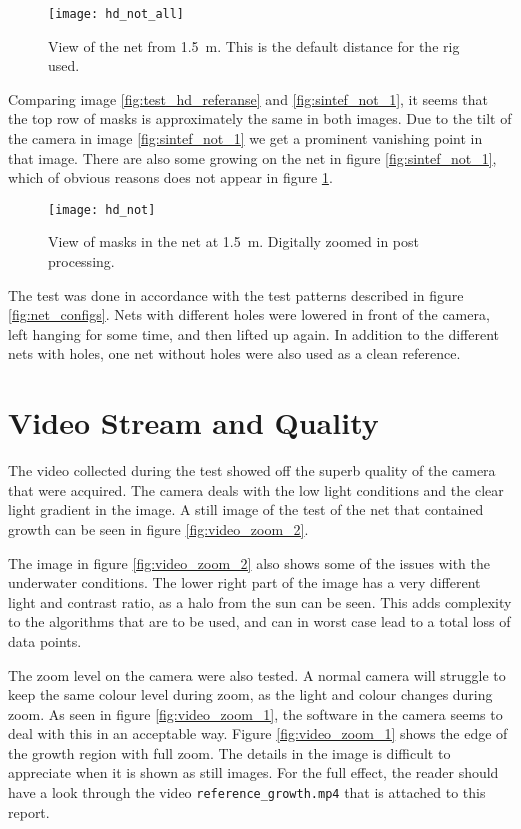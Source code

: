 \begin{figure}[htbp]
	\centering
	\texttt{[image: hd\_not\_all]}
	\caption{View of the net from \SI{1.5}{\metre}. This is the default distance for the rig used.}
	\label{fig:test_hd_referanse}
\end{figure}

Comparing image \vref{fig:test_hd_referanse} and \vref{fig:sintef_not_1}, it seems that the 
top row of masks is approximately the same in both images. Due to the tilt of the 
camera in image \ref{fig:sintef_not_1} we get a prominent vanishing point in that image. There 
are also some growing on the net in figure \ref{fig:sintef_not_1}, which of obvious reasons does not appear 
in figure \ref{fig:test_hd_referanse}.

\begin{figure}[htbp]
	\centering
	\texttt{[image: hd\_not]}
	\caption{View of masks in the net at \SI{1.5}{\metre}. Digitally zoomed in post processing.}
	\label{fig:test_hd_clip}
\end{figure}

The test was done in accordance with the test patterns described in figure \vref{fig:net_configs}. 
Nets with different holes were lowered in front of the camera, left hanging for some time, and then lifted up 
again. In addition to the different nets with holes, one net without holes were also used as a 
clean reference.



\section{Video Stream and Quality}

The video collected during the test showed off the superb quality of the camera that were acquired. The camera 
deals with the low light conditions and the clear light gradient in the image. A still image of the 
test of the net that contained growth can be seen in figure \vref{fig:video_zoom_2}. 

The image in figure \ref{fig:video_zoom_2} also shows some of the issues with the underwater conditions. 
The lower right part of the image has a very different light and contrast ratio, as a halo from the 
sun can be seen. This adds complexity to the algorithms that are to be used, and can in 
worst case lead to a total loss of data points. 

The zoom level on the camera were also tested. A normal camera will struggle to keep the same colour level 
during zoom, as the light and colour changes during zoom. As seen in figure \vref{fig:video_zoom_1}, the 
software in the camera seems to deal with this in an acceptable way. Figure \ref{fig:video_zoom_1} shows
the edge of the growth region with full zoom. The details in the image is difficult to appreciate 
when it is shown as still images. For the full effect, the reader should have a look through 
the video \verb|reference_growth.mp4| that is attached to this report.

